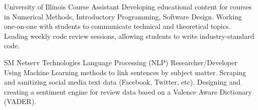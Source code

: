 \documentclass[10pt, oneside, openany]{article} %
\begin{document}
\begin{paracol}{2}
{} %
{University of Illinois} %
{Course Assistant} %
{Developing educational content for courses in Numerical Methods, Introductory Programming, Software Design. Working one-on-one with students to communicate technical and theoretical topics. Leading weekly code review sessions, allowing students to write industry-standard code.}%

{} %
{SM Netserv Technologies} %
{Language Processing (NLP) Researcher/Developer} %
{Using Machine Learning methods to link sentences by subject matter. Scraping and sanitizing social media text data (Facebook, Twitter, etc). Designing and creating a sentiment engine for review data based on a Valence Aware Dictionary (VADER).}%












\end{paracol}
\end{document}
